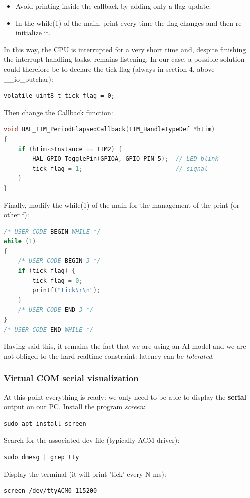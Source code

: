 \begin{itemize}
    \item Avoid printing inside the callback by adding only a flag update.
    \item In the while(1) of the main, print every time the flag changes and then re-initialize it.
\end{itemize}

In this way, the CPU is interrupted for a very short time and, despite finishing the interrupt handling tasks, remains listening.
In our case, a possible solution could therefore be to declare the tick flag (always in section 4, above \_\_io\_putchar):

\begin{verbatim}
volatile uint8_t tick_flag = 0;
\end{verbatim}

Then change the Callback function:

\begin{lstlisting}[language=C]
void HAL_TIM_PeriodElapsedCallback(TIM_HandleTypeDef *htim)
{
    if (htim->Instance == TIM2) {
        HAL_GPIO_TogglePin(GPIOA, GPIO_PIN_5);  // LED blink
        tick_flag = 1;                          // signal
    }
}
\end{lstlisting}

Finally, modify the while(1) of the main for the management of the print (or other f):

\begin{lstlisting}[language=C]
/* USER CODE BEGIN WHILE */
while (1)
{
    /* USER CODE BEGIN 3 */
    if (tick_flag) {
        tick_flag = 0;
        printf("tick\r\n");
    }
    /* USER CODE END 3 */
}
/* USER CODE END WHILE */
\end{lstlisting}

Having said this, it remains the fact that we are using an AI model and we are not obliged to the hard-realtime constraint: latency can be \textit{tolerated}.

\subsubsection{Virtual COM serial visualization}
At this point everything is ready: we only need to be able to display the \textbf{serial} output on our PC. Install the program \textit{screen}:
\begin{verbatim}
sudo apt install screen
\end{verbatim}
Search for the associated dev file (typically ACM driver):
\begin{verbatim}
sudo dmesg | grep tty
\end{verbatim}
Display the terminal (it will print 'tick' every N ms):
\begin{verbatim}
screen /dev/ttyACM0 115200
\end{verbatim}


